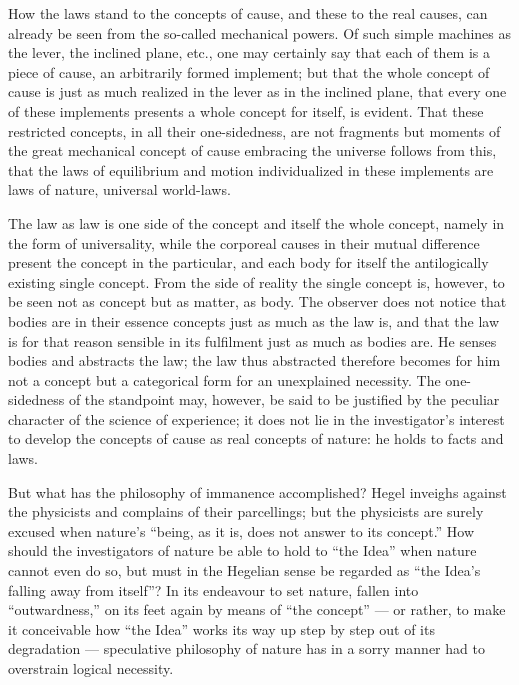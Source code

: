 \documentclass[12pt,a4paper]{book}
\begin{document}
How the laws stand to the concepts of cause, and these to the real causes, can already be seen
from the so-called mechanical powers. Of such simple machines as the lever, the inclined plane,
etc., one may certainly
say that each of them is a piece of cause, an arbitrarily formed implement; but that the whole
concept of cause is just as much realized in the lever as in the inclined plane, that every one
of these implements presents a whole concept for itself, is evident. That these restricted
concepts, in all their one-sidedness, are not fragments but moments of the great mechanical
concept of cause embracing the universe follows from this, that the laws of equilibrium and
motion individualized in these implements are laws of nature, universal world-laws.

The law as law is one side of the concept and itself the whole concept, namely in the form of
universality, while the corporeal causes in their mutual difference present the concept in the
particular, and each body for itself the antilogically existing single concept. From the side of
reality the single concept is, however, to be seen not as concept but as matter, as body. The
observer does not notice that bodies are in their essence concepts just as much as the law is,
and that the law is for that reason sensible in its fulfilment just as much as bodies are. He
senses bodies and abstracts the law; the law thus abstracted therefore becomes for him not a
concept but a categorical form for an unexplained necessity. The one-sidedness of the standpoint
may, however, be said to be justified by the peculiar character of the science of experience; it
does not lie in the investigator's interest to develop the concepts of cause as real concepts of
nature: he holds to facts and laws.

But what has the philosophy of immanence accomplished? Hegel inveighs against the physicists and
complains of their parcellings; but the physicists are surely excused when nature's ``being, as
it is, does not answer to its concept.'' How should the investigators of nature be able to hold
to ``the Idea'' when nature cannot even do so, but must in the Hegelian sense be regarded as
``the Idea's falling away from itself''? In its
endeavour to set nature, fallen into ``outwardness,'' on its feet again by means of ``the
concept'' --- or rather, to make it conceivable how ``the Idea'' works its way up step by step
out of its degradation --- speculative philosophy of nature has in a sorry manner had to
overstrain logical necessity.
\end{document}
